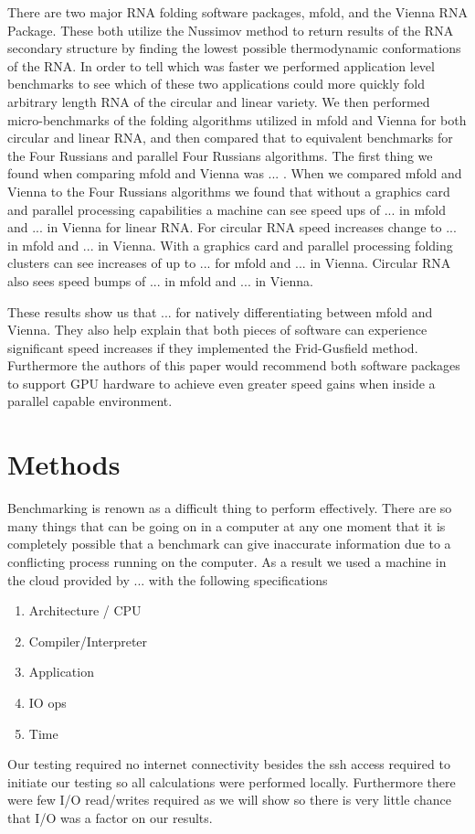 \documentclass[12pt]{article}
\begin{document}
\par There are two major RNA folding software packages, mfold\cite{zuker1989,zuker1981}, and the Vienna RNA Package\cite{vienna}. These both utilize the Nussimov method to return results of the RNA secondary structure by finding the lowest possible thermodynamic conformations of the RNA\cite{zuker1981,vienna}. In order to tell which was faster we performed application level benchmarks\cite{eulogy} to see which of these two applications could more quickly fold arbitrary length RNA of the circular and linear variety. We then performed micro-benchmarks\cite{sysperformance} of the folding algorithms utilized in mfold and Vienna for both circular and linear RNA, and then compared that to equivalent benchmarks for the Four Russians and parallel Four Russians algorithms. The first thing we found when comparing mfold and Vienna was ... . When we compared mfold and Vienna to the Four Russians algorithms we found that without a graphics card and parallel processing capabilities a machine can see speed ups of ... in mfold and ... in Vienna for linear RNA. For circular RNA speed increases change to ... in mfold and ... in Vienna. With a graphics card and parallel processing folding clusters can see increases of up to ... for mfold and ... in Vienna. Circular RNA also sees speed bumps of ... in mfold and ... in Vienna.
\par These results show us that ... for natively differentiating between mfold and Vienna. They also help explain that both pieces of software can experience significant speed increases if they implemented the Frid-Gusfield method. Furthermore the authors of this paper would recommend both software packages to support GPU hardware to achieve even greater speed gains when inside a parallel capable environment.

\section{Methods}
Benchmarking is renown as a difficult thing to perform effectively\cite{sysperformance,eulogy}. There are so many things that can be going on in a computer at any one moment that it is completely possible that a benchmark can give inaccurate information due to a conflicting process running on the computer\cite{sysperformance}. As a result we used a machine in the cloud provided by ... with the following specifications
\begin{enumerate}
    \item Architecture / CPU
    \item Compiler/Interpreter
    \item Application
    \item IO ops
    \item Time
\end{enumerate}
Our testing required no internet connectivity besides the ssh access required to initiate our testing so all calculations were performed locally. Furthermore there were few I/O read/writes required as we will show so there is very little chance that I/O was a factor on our results.
\end{document}
